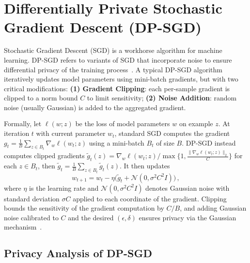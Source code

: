 \documentclass[11pt]{article}
\theoremstyle{remark}
\theoremstyle{definition}
\theoremstyle{plain}
\begin{document}
\section{Differentially Private Stochastic Gradient Descent (DP-SGD)}

Stochastic Gradient Descent (SGD) is a workhorse algorithm for machine learning. DP-SGD refers to variants of SGD that incorporate noise to ensure differential privacy of the training process~\cite{Song2013, Abadi2016}. A typical DP-SGD algorithm iteratively updates model parameters using mini-batch gradients, but with two critical modifications: \textbf{(1) Gradient Clipping}: each per-sample gradient is clipped to a norm bound $C$ to limit sensitivity; \textbf{(2) Noise Addition}: random noise (usually Gaussian) is added to the aggregated gradient. 

Formally, let $\ell(w; z)$ be the loss of model parameters $w$ on example $z$. At iteration $t$ with current parameter $w_t$, standard SGD computes the gradient $g_t = \frac{1}{B}\sum_{z \in B_t} \nabla_w \ell(w_t; z)$ using a mini-batch $B_t$ of size $B$. DP-SGD instead computes clipped gradients $\tilde{g}_t(z) = \nabla_w \ell(w_t; z) / \max\{1, \frac{\|\nabla_w \ell(w_t; z)\|_2}{C}\}$ for each $z \in B_t$, then $\tilde{g}_t = \frac{1}{B}\sum_{z \in B_t} \tilde{g}_t(z)$. It then updates
\[
w_{t+1} = w_t - \eta \big(\tilde{g}_t + \mathcal{N}(0, \sigma^2 C^2 I)\big)\,,
\] 
where $\eta$ is the learning rate and $\mathcal{N}(0, \sigma^2 C^2 I)$ denotes Gaussian noise with standard deviation $\sigma C$ applied to each coordinate of the gradient. Clipping bounds the sensitivity of the gradient computation by $C/B$, and adding Gaussian noise calibrated to $C$ and the desired $(\epsilon,\delta)$ ensures privacy via the Gaussian mechanism~\cite{DworkRoth2014}.

\subsection{Privacy Analysis of DP-SGD}
\end{document}
